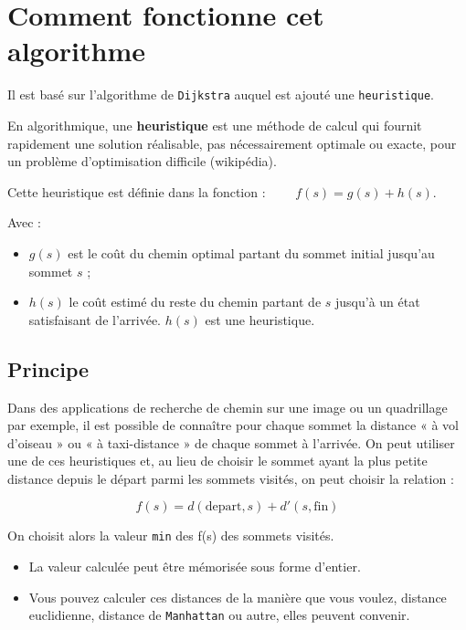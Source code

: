 \section{Comment fonctionne cet algorithme}

Il est basé sur l'algorithme de \texttt{Dijkstra} auquel est ajouté une \texttt{heuristique}.


\begin{defi}[Heuristique]

En algorithmique, une \textbf{heuristique} est une méthode de calcul qui fournit rapidement une solution réalisable, pas nécessairement optimale ou exacte, pour un problème d'optimisation difficile (wikipédia).

Cette heuristique est définie dans la fonction : $\quad \quad f(s)=g(s)+h(s) $.

Avec :
\begin{itemize}
\item $g(s)$ est le coût du chemin optimal partant du sommet initial jusqu'au sommet $s$ ;
\item $h(s)$ le coût estimé du reste du chemin partant de $s$ jusqu'à un état satisfaisant de l'arrivée. $h(s)$ est une heuristique.
\end{itemize}

\end{defi}

\subsection{Principe}


\begin{prop}

Dans des applications de recherche de chemin sur une image ou un quadrillage par exemple, il est possible de connaître pour chaque sommet la distance « à vol d'oiseau » ou « à taxi-distance » de chaque sommet à l'arrivée. On peut utiliser une de ces heuristiques et, au lieu de choisir le sommet ayant la plus petite distance depuis le départ parmi les sommets visités, on peut choisir la relation :


$$f(s)=d(\text{depart},s)+d'(s,\text{fin}) $$

On choisit alors la valeur \texttt{min} des f(s) des sommets visités.

\end{prop}

\begin{rem}
\begin{itemize}
\item La valeur calculée peut être mémorisée sous forme d'entier.%
\item Vous pouvez calculer ces distances de la manière que vous voulez, distance euclidienne, distance de \texttt{Manhattan} ou autre, elles peuvent convenir.\\
\end{itemize}
\end{rem}




